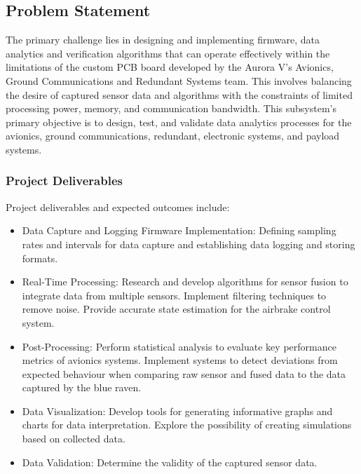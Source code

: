 \subsection{Problem Statement}
The primary challenge lies in designing and implementing firmware, data analytics and verification algorithms that can operate effectively within the limitations of the custom PCB board developed by the Aurora V's Avionics, Ground Communications and Redundant Systems team. This involves balancing the desire of captured sensor data and algorithms with the constraints of limited processing power, memory, and communication bandwidth. This subsystem’s primary objective is to design, test, and validate data analytics processes for the avionics, ground communications, redundant, electronic systems, and payload systems. 

\subsubsection{Project Deliverables}
Project deliverables and expected outcomes include:  
\begin{itemize}
  \item Data Capture and Logging Firmware Implementation: Defining sampling rates and intervals for data capture and establishing data logging and storing formats. 
  \item Real-Time Processing: Research and develop algorithms for sensor fusion to integrate data from multiple sensors. Implement filtering techniques to remove noise. Provide accurate state estimation for the airbrake control system. 
  \item Post-Processing: Perform statistical analysis to evaluate key performance metrics of avionics systems. Implement systems to detect deviations from expected behaviour when comparing raw sensor and fused data to the data captured by the blue raven. 
  \item Data Visualization: Develop tools for generating informative graphs and charts for data interpretation. Explore the possibility of creating simulations based on collected data. 
  \item Data Validation: Determine the validity of the captured sensor data.  
\end{itemize}

